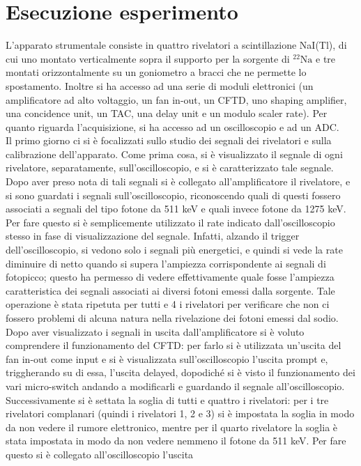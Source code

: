 \section{Esecuzione esperimento}
L'apparato strumentale consiste in quattro rivelatori a scintillazione NaI(Tl), di cui uno montato verticalmente sopra il supporto per la sorgente di $^{22}\mathrm{Na}$ e tre
montati orizzontalmente su un goniometro a bracci che ne permette lo spostamento. Inoltre si ha accesso ad una serie di moduli elettronici (un amplificatore ad alto voltaggio,
un fan in-out, un CFTD, uno shaping amplifier, una concidence unit, un TAC, una delay unit e un modulo scaler rate). Per quanto riguarda l'acquisizione, si ha accesso
ad un oscilloscopio e ad un ADC.\\

Il primo giorno ci si è focalizzati sullo studio dei segnali dei rivelatori e sulla calibrazione dell'apparato. Come prima cosa, si è visualizzato il segnale di ogni
rivelatore, separatamente, sull'oscilloscopio, e si è caratterizzato tale segnale.
Dopo aver preso nota di tali segnali si è collegato all'amplificatore il rivelatore, e si sono guardati i segnali sull'oscilloscopio, riconoscendo quali di questi fossero
associati a segnali del tipo fotone da 511 keV e quali invece
fotone da 1275 keV. Per fare questo si è semplicemente utilizzato il rate indicato dall'oscilloscopio stesso in fase di visualizzazione del segnale. Infatti, alzando il
trigger dell'oscilloscopio, si vedono solo i segnali più energetici, e quindi si vede la rate diminuire di netto quando si supera l'ampiezza corrispondente ai segnali di fotopicco; questo ha permesso di vedere effettivamente quale fosse l'ampiezza
caratteristica dei segnali associati ai diversi fotoni emessi dalla sorgente. Tale operazione è stata ripetuta per tutti e 4 i rivelatori per verificare che non ci fossero
problemi di alcuna natura nella rivelazione dei fotoni emessi dal sodio. Dopo aver visualizzato i segnali in uscita dall'amplificatore si è voluto comprendere il funzionamento
del CFTD: per farlo si è utilizzata un'uscita del fan in-out come input e si è visualizzata sull'oscilloscopio l'uscita prompt e, triggherando su di essa, l'uscita delayed,
dopodiché si è visto il funzionamento dei vari micro-switch andando a modificarli e guardando il segnale all'oscilloscopio. Successivamente si è settata la soglia di tutti
e quattro i rivelatori: per i tre rivelatori complanari (quindi i rivelatori 1, 2 e 3) si è impostata la soglia in modo da non vedere il rumore elettronico, mentre per
il quarto rivelatore la soglia è stata impostata in modo da non vedere nemmeno il fotone da 511 keV. Per fare questo si è collegato all'oscilloscopio l'uscita
